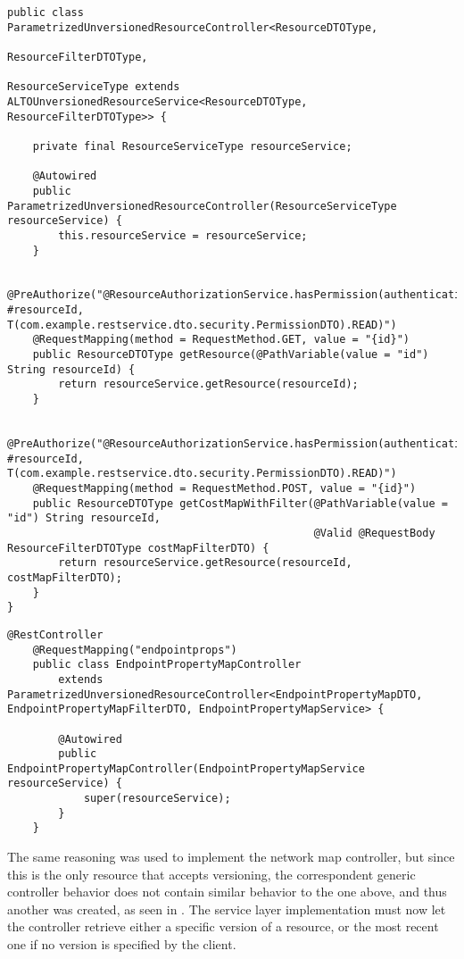     \begin{lstlisting}[label={lst:generic-controller}]
    public class ParametrizedUnversionedResourceController<ResourceDTOType,
                                                           ResourceFilterDTOType,
                                                           ResourceServiceType extends ALTOUnversionedResourceService<ResourceDTOType, ResourceFilterDTOType>> {

    private final ResourceServiceType resourceService;

    @Autowired
    public ParametrizedUnversionedResourceController(ResourceServiceType resourceService) {
        this.resourceService = resourceService;
    }

    @PreAuthorize("@ResourceAuthorizationService.hasPermission(authentication, #resourceId, T(com.example.restservice.dto.security.PermissionDTO).READ)")
    @RequestMapping(method = RequestMethod.GET, value = "{id}")
    public ResourceDTOType getResource(@PathVariable(value = "id") String resourceId) {
        return resourceService.getResource(resourceId);
    }

    @PreAuthorize("@ResourceAuthorizationService.hasPermission(authentication, #resourceId, T(com.example.restservice.dto.security.PermissionDTO).READ)")
    @RequestMapping(method = RequestMethod.POST, value = "{id}")
    public ResourceDTOType getCostMapWithFilter(@PathVariable(value = "id") String resourceId,
                                                @Valid @RequestBody ResourceFilterDTOType costMapFilterDTO) {
        return resourceService.getResource(resourceId, costMapFilterDTO);
    }
}

    \end{lstlisting}

    \begin{lstlisting}[label={lst:endpoint-property-map-controller}]
    @RestController
    @RequestMapping("endpointprops")
    public class EndpointPropertyMapController
        extends ParametrizedUnversionedResourceController<EndpointPropertyMapDTO, EndpointPropertyMapFilterDTO, EndpointPropertyMapService> {

        @Autowired
        public EndpointPropertyMapController(EndpointPropertyMapService resourceService) {
            super(resourceService);
        }
    }

    \end{lstlisting}

    The same reasoning was used to implement the network map controller, but since this is the only resource that accepts versioning, the correspondent generic controller behavior does not contain similar behavior to the one above, and thus another was created, as seen in \cite{lst:versioned-controller}.
    The service layer implementation must now let the controller retrieve either a specific version of a resource, or the most recent one if no version is specified by the client.


